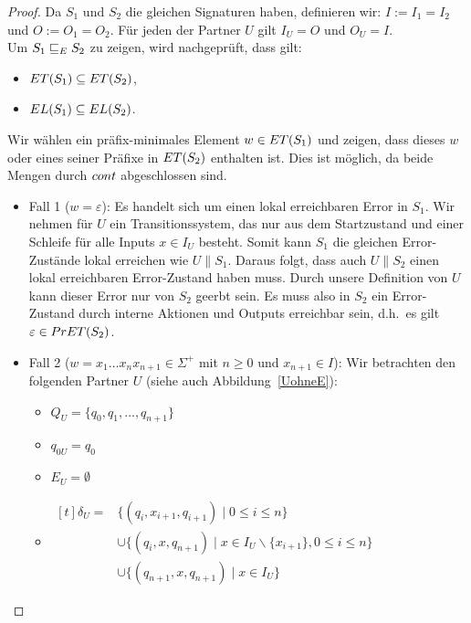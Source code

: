 \begin{proof}
  Da $S_1$ und $S_2$ die gleichen Signaturen haben, definieren wir:
  $I:=I_1=I_2$ und $O:=O_1=O_2$. Für jeden der Partner $U$ gilt $I_U=O$ und
  $O_U=I$.\\
  Um $S_1\ERel S_2$ zu zeigen, wird nachgeprüft, dass gilt:
  \begin{itemize}
    \item $\ET{}(S_1)\subseteq \ET{}(S_2)$,
    \item $\EL{}(S_1)\subseteq \EL{}(S_2)$.
  \end{itemize}
  Wir wählen ein präfix-minimales Element $w\in \ET{}(S_1)$ und
  zeigen, dass dieses $w$ oder eines seiner Präfixe in $\ET{}(S_2)$ enthalten ist.
  Dies ist möglich, da beide Mengen durch $\cont{}$ abgeschlossen sind.
  \begin{itemize}
    \item Fall 1 ($w=\varepsilon$): Es handelt sich um einen lokal erreichbaren
      Error in $S_1$.
      Wir nehmen für $U$ ein Transitionssystem, das nur aus dem Startzustand und
      einer Schleife für alle Inputs $x\in I_U$ besteht. Somit kann $S_1$ die gleichen
      Error-Zustände lokal erreichen wie $U\|S_1$. Daraus folgt, dass auch
      $U\|S_2$ einen lokal erreichbaren Error-Zustand haben muss. Durch unsere
      Definition von $U$ kann dieser Error nur von $S_2$ geerbt sein. Es
      muss also in $S_2$ ein Error-Zustand durch interne Aktionen und Outputs
      erreichbar sein, d.h.\ es gilt $\varepsilon\in \PrET{}(S_2)$.
    \item Fall 2 ($w=x_1\dots x_n x_{n+1}\in\Sigma ^+$ mit $n\geq 0$ und
      $x_{n+1}\in I$): Wir betrachten den folgenden Partner $U$ (siehe auch
      Abbildung~\ref{UohneE}):
      \begin{itemize}
        \item $Q_U=\{q_0,q_1,\dots ,q_{n+1}\}$
        \item $q_{0U}=q_0$
        \item $E_U=\emptyset$
        \item $\begin{aligned}[t]
            \delta _U=&\{(q_i,x_{i+1},q_{i+1})\mid  0\leq i\leq n\}\\
                      &\cup\{(q_i,x,q_{n+1})\mid  x\in I_U\backslash\{x_{i+1}\},
          0\leq i\leq n\}\\
          &\cup\{(q_{n+1},x,q_{n+1})\mid  x\in I_U\}
        \end{aligned}$
      \end{itemize}
      \begin{figure} [h!tbp]
      \begin{center}
        \begin{tikzpicture}[->, >=latex',auto,node distance =3cm, semithick]


\end{tikzpicture}
\end{center}
\end{figure}
\end{itemize}
\end{proof}
